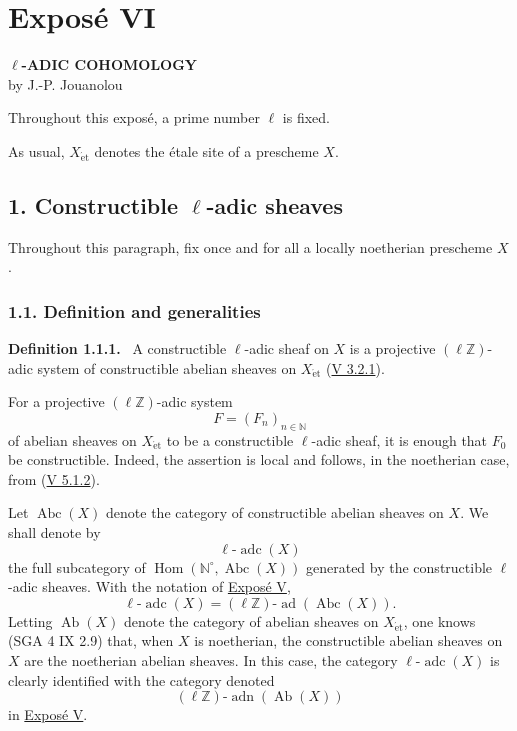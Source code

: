 \documentclass[11pt]{article}
\newenvironment{statement}[1]{\par\medskip\noindent\textbf{#1.}\ }{\par\medskip}
\DeclareMathOperator{\Hom}{Hom}
\providecommand{\Hom}{\operatorname{Hom}}
\providecommand{\adn}{\operatorname{adn}}
\providecommand{\Ab}{\operatorname{Ab}}
\providecommand{\Abc}{\operatorname{Abc}}
\providecommand{\adc}{\operatorname{adc}}
\providecommand{\ad}{\operatorname{ad}}
\providecommand{\adn}{\operatorname{adn}}
\providecommand{\Ab}{\operatorname{Ab}}
\providecommand{\Hom}{\operatorname{Hom}}
\begin{document}
\label{sga5:VI:expose:vi}\section*{Exposé VI}

\begin{center}
\textbf{\(\ell\)-ADIC COHOMOLOGY}\\[0.5em]
by J.-P. Jouanolou
\end{center}

Throughout this exposé, a prime number \(\ell\) is fixed.

As usual, \(X_{\mathrm{\acute et}}\) denotes the étale site of a prescheme \(X\).

\subsection*{1. Constructible \(\ell\)-adic sheaves}\label{sga5:VI:subsection:1}

Throughout this paragraph, fix once and for all a locally noetherian prescheme \(X\).

\subsubsection*{1.1. Definition and generalities}\label{sga5:VI:subsubsection:1.1}

\label{sga5:VI:definition:1.1.1}\begin{statement}{Definition 1.1.1}
A constructible \(\ell\)-adic sheaf on \(X\) is a projective \((\ell\mathbb Z)\)-adic system of constructible abelian sheaves on \(X_{\mathrm{\acute et}}\) (\hyperref[sga5:V:proposition:3.2.1]{V 3.2.1}).
\end{statement}

For a projective \((\ell\mathbb Z)\)-adic system
\[
F=(F_n)_{n\in\mathbb N}
\]
of abelian sheaves on \(X_{\mathrm{\acute et}}\) to be a constructible \(\ell\)-adic sheaf, it is enough that \(F_0\) be constructible. Indeed, the assertion is local and follows, in the noetherian case, from (\hyperref[sga5:V:proposition:5.1.2]{V 5.1.2}).

Let \(\Abc(X)\) denote the category of constructible abelian sheaves on \(X\). We shall denote by
\[
\ell\text{-}\adc(X)
\]
the full subcategory of \(\Hom(\mathbb N^\circ,\Abc(X))\) generated by the constructible \(\ell\)-adic sheaves. With the notation of \hyperref[sga5:V:expose:v]{Exposé V},
\[
\ell\text{-}\adc(X)=(\ell\mathbb Z)\text{-}\ad(\Abc(X)).
\]
Letting \(\Ab(X)\) denote the category of abelian sheaves on \(X_{\mathrm{\acute et}}\), one knows (SGA 4 IX 2.9) that, when \(X\) is noetherian, the constructible abelian sheaves on \(X\) are the noetherian abelian sheaves. In this case, the category \(\ell\text{-}\adc(X)\) is clearly identified with the category denoted
\[
(\ell\mathbb Z)\text{-}\adn(\Ab(X))
\]
in \hyperref[sga5:V:expose:v]{Exposé V}.
\end{document}
